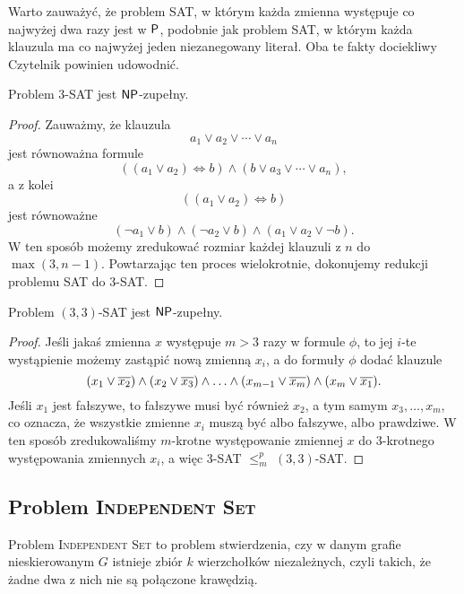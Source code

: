 Warto zauważyć, że problem SAT, w którym każda zmienna występuje co najwyżej dwa razy jest w $\textsf{P}$, podobnie jak problem SAT, w którym każda klauzula ma co najwyżej jeden niezanegowany literał. Oba te fakty dociekliwy Czytelnik powinien udowodnić.

\begin{theorem}\label{t:3-SAT}
    Problem 3-SAT jest $\textsf{NP}$-zupełny.
\end{theorem}
\begin{proof}
    Zauważmy, że klauzula
    \[ a_1 \lor a_2 \lor \cdots \lor a_n \]
    jest równoważna formule
    \[ ((a_1 \lor a_2) \Leftrightarrow b) \land (b \lor a_3 \lor \cdots \lor a_n), \]
    a z kolei
    \[ ((a_1 \lor a_2) \Leftrightarrow b) \]
    jest równoważne
    \[ (\neg a_1 \lor b) \land (\neg a_2 \lor b) \land (a_1 \lor a_2 \lor \neg b). \]
    W ten sposób możemy zredukować rozmiar każdej klauzuli z $n$ do $\max(3, n-1)$. Powtarzając ten proces wielokrotnie, dokonujemy redukcji problemu SAT do 3-SAT.
\end{proof}

\begin{theorem}\label{t:3,3-SAT}
    Problem $(3, 3)$-SAT jest $\textsf{NP}$-zupełny.
\end{theorem}
\begin{proof}
    Jeśli jakaś zmienna $x$ występuje $m > 3$ razy w formule $\phi$, to jej $i$-te wystąpienie możemy zastąpić nową zmienną $x_i$, a do formuły $\phi$ dodać klauzule
    \[ (x_1 \lor \overline{x_2}) \land (x_2 \lor \overline{x_3}) \land \ldots \land (x_{m-1} \lor \overline{x_m}) \land (x_m \lor \overline{x_1}). \]
    Jeśli $x_1$ jest fałszywe, to fałszywe musi być również $x_2$, a tym samym $x_3, \ldots, x_m$, co oznacza, że wszystkie zmienne $x_i$ muszą być albo fałszywe, albo prawdziwe. W ten sposób zredukowaliśmy $m$-krotne występowanie zmiennej $x$ do 3-krotnego występowania zmiennych $x_i$, a więc 3-SAT $\leq_m^p$ $(3, 3)$-SAT.
\end{proof}

\subsection{Problem \textsc{Independent Set}}

Problem \textsc{Independent Set} to problem stwierdzenia, czy w danym grafie nieskierowanym $G$ istnieje zbiór $k$ wierzchołków niezależnych, czyli takich, że żadne dwa z nich nie są połączone krawędzią.

